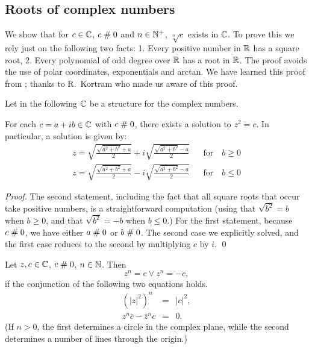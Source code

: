 
\subsection{Roots of complex numbers}
We show that for $c \in\mathbb{C}$, $c \mathrel{\#} 0$ and $n\in\mathbb{N}^+$, $\sqrt[n]{c}$
exists in $\mathbb{C}$.
To prove this we rely just on the following two facts: 1. Every
positive number in $\mathbb{R}$ has a square root, 2. Every
polynomial of odd degree over $\mathbb{R}$ has a root in $\mathbb{R}$.
The proof avoids the use of polar coordinates, exponentials and
arctan. We have learned this proof from \cite{Litt41}; thanks to R.\
Kortram who made us aware of this proof. 

Let in the following $\mathbb{C}$ be a structure for the complex numbers. 

\begin{lemma}
For each $c = a+ib \in\mathbb{C}$ with $c \mathrel{\#} 0$, there exists a solution to
$z^2 = c$. In particular, 
a solution is given by:
\begin{eqnarray*}
  z = \sqrt{\frac{\sqrt{a^2 + b^2} +a}{2}} + i
  \sqrt{\frac{\sqrt{a^2 + b^2} -a}{2}}&&\mbox{for}\quad b \geq 0\\
  z = \sqrt{\frac{\sqrt{a^2 + b^2} +a}{2}} - i
  \sqrt{\frac{\sqrt{a^2 + b^2} -a}{2}}&&\mbox{for}\quad b \leq 0
\end{eqnarray*}
\end{lemma}

\begin{proof}
The second statement, including the fact that all square roots that
occur take positive numbers, is a straightforward computation
(using that $\sqrt{b^2} = b$ when $b\geq 0$, and that $\sqrt{b^2} = -b$ when
$b\leq 0$.)
For the first statement, because $c \mathrel{\#} 0$, we have either $a \mathrel{\#} 0$ or
$b \mathrel{\#} 0$.  The second case we explicitly solved, and the first
case reduces to the second by multiplying $c$ by $i$.
\qed
\end{proof}

\begin{lemma}\label{lemCrootequiv}
Let $z, c\in\mathbb{C}$, $c\mathrel{\#} 0$, $n\in\mathbb{N}$. Then
$$z^n = c \vee z^n = -c,$$
if the conjunction of the following two equations holds.
  \begin{eqnarray}
    (|z|^2)^n &=& |c|^2,\\
    z^n \bar{c} - \bar{z}^n c &=&0.
  \end{eqnarray}
(If $n>0$, the first determines a circle in the complex plane,
while the second determines a number of lines through the origin.)
\end{lemma}

